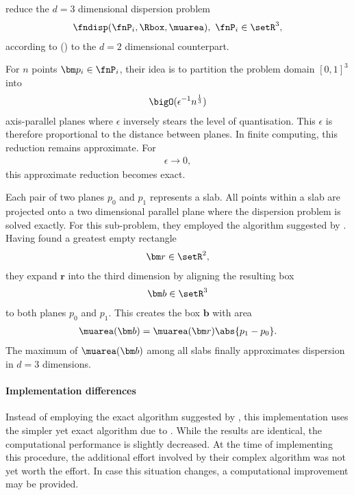 %
 reduce the $d=3$ dimensional dispersion problem
\begin{align*}
  \fndisp(\fnP_i, \Rbox, \muarea),\ \fnP_i \in \setR^3,
\end{align*}
according to () to the $d=2$ dimensional counterpart. 

For $n$ points $\bm p_i \in \fnP_i$, their idea is to partition the problem domain $[0,1]^3$ into 
\begin{align*}
  \bigO(\epsilon^{-1} n^{\frac{1}{3}})
\end{align*}
axis-parallel planes where $\epsilon$ inversely stears the level of quantisation. This $\epsilon$ is therefore proportional to the distance between planes. In finite computing, this reduction remains approximate. For
\begin{align*}
  \epsilon \rightarrow 0,
\end{align*}
this approximate reduction becomes exact.

Each pair of two planes $p_0$ and $p_1$ represents a slab. All points within a slab are projected onto a two dimensional parallel plane where the dispersion problem is solved exactly. For this sub-problem, they employed the algorithm suggested by . Having found a greatest empty rectangle 
\begin{align*}
  \bm r \in \setR^2,
\end{align*}
they expand $\bm r$ into the third dimension by aligning the resulting box
\begin{align*}
  \bm b \in \setR^3
\end{align*}
to both planes $p_0$ and $p_1$. This creates the box $\bm b$ with area
\begin{align*}
  \muarea(\bm b) = \muarea(\bm r) \abs{p_1 - p_0}.
\end{align*}
The maximum of $\muarea(\bm b)$ among all slabs finally approximates dispersion in $d=3$ dimensions.

\paragraph{Implementation differences}

Instead of employing the exact algorithm suggested by , this implementation uses the simpler yet exact algorithm due to . While the results are identical, the computational performance is slightly decreased. At the time of implementing this procedure, the additional effort involved by their complex algorithm was not yet worth the effort. In case this situation changes, a computational improvement may be provided.

